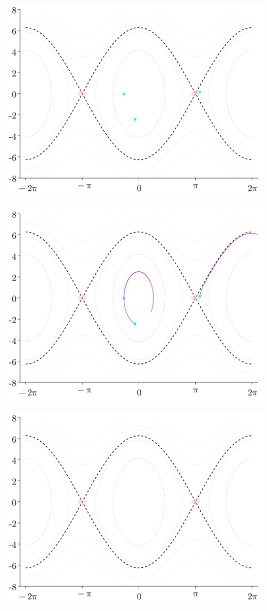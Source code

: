 \documentclass[
]{report}
\begin{document}
\includegraphics{contents/assets/neuralpbc/031.svg}

\includegraphics{contents/assets/neuralpbc/032.svg}

\includegraphics{contents/assets/neuralpbc/033.svg}
\end{document}
